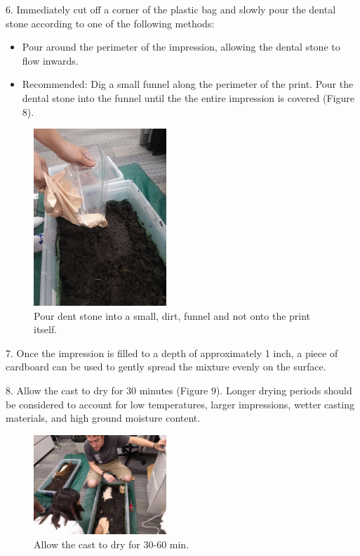 \newpage

6. Immediately cut off a corner of the plastic bag and slowly pour the dental stone according to one of the following methods:
\begin{itemize}
\item Pour around the perimeter of the impression, allowing the dental stone to flow inwards.
\item Recommended: Dig a small funnel along the perimeter of the print. Pour the dental stone into the funnel until the the entire impression is covered (Figure 8).
\end{itemize}

\begin{figure}[!htp]
\centering
\includegraphics[width=5cm]{Cast_Pour}
\caption{Pour dent stone into a small, dirt, funnel and not onto the print itself.}
\label{Image 8}
\end{figure}

\newpage

7. Once the impression is filled to a depth of approximately 1 inch, a piece of cardboard can be used to gently spread the mixture evenly on the surface.

8. Allow the cast to dry for 30 minutes (Figure 9). Longer drying periods should be considered to account for low temperatures, larger impressions, wetter casting materials, and high ground moisture content.

\begin{figure}[!htp]
\centering
\includegraphics[width=5cm]{Cast_Set}
\caption{Allow the cast to dry for 30-60 min.}
\label{Image 9}
\end{figure}

